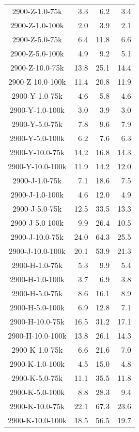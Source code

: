 \begin{longtable}{crrr}
    2900-Z-1.0-75k &   3.3 &    6.2 &   3.4 \\
    2900-Z-1.0-100k &   2.0 &    3.9 &   2.1 \\
    2900-Z-5.0-75k &   6.4 &   11.8 &   6.6 \\
    2900-Z-5.0-100k &   4.9 &    9.2 &   5.1 \\
    2900-Z-10.0-75k &  13.8 &   25.1 &  14.4 \\
    2900-Z-10.0-100k &  11.4 &   20.8 &  11.9 \\
    2900-Y-1.0-75k &   4.6 &    5.8 &   4.6 \\
    2900-Y-1.0-100k &   3.0 &    3.9 &   3.0 \\
    2900-Y-5.0-75k &   7.8 &    9.6 &   7.9 \\
    2900-Y-5.0-100k &   6.2 &    7.6 &   6.3 \\
    2900-Y-10.0-75k &  14.2 &   16.8 &  14.3 \\
    2900-Y-10.0-100k &  11.9 &   14.2 &  12.0 \\
    2900-J-1.0-75k &   7.1 &   18.6 &   7.5 \\
    2900-J-1.0-100k &   4.6 &   12.0 &   4.9 \\
    2900-J-5.0-75k &  12.5 &   33.5 &  13.3 \\
    2900-J-5.0-100k &   9.9 &   26.4 &  10.5 \\
    2900-J-10.0-75k &  24.0 &   64.3 &  25.5 \\
    2900-J-10.0-100k &  20.1 &   53.9 &  21.3 \\
    2900-H-1.0-75k &   5.3 &    9.9 &   5.4 \\
    2900-H-1.0-100k &   3.7 &    6.9 &   3.8 \\
    2900-H-5.0-75k &   8.6 &   16.1 &   8.9 \\
    2900-H-5.0-100k &   6.9 &   12.8 &   7.1 \\
    2900-H-10.0-75k &  16.5 &   31.2 &  17.1 \\
    2900-H-10.0-100k &  13.8 &   26.1 &  14.3 \\
    2900-K-1.0-75k &   6.6 &   21.6 &   7.0 \\
    2900-K-1.0-100k &   4.5 &   15.0 &   4.8 \\
    2900-K-5.0-75k &  11.1 &   35.5 &  11.8 \\
    2900-K-5.0-100k &   8.8 &   28.3 &   9.4 \\
    2900-K-10.0-75k &  22.1 &   67.3 &  23.6 \\
    2900-K-10.0-100k &  18.5 &   56.5 &  19.7 \\

\end{longtable}

